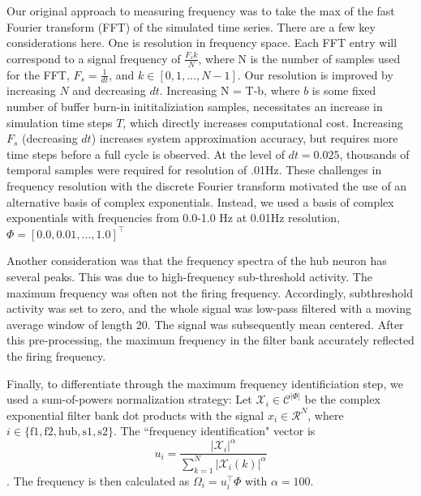 \documentclass[11pt]{article}
\begin{document}
Our original approach to measuring frequency was to take the max of the fast Fourier transform (FFT) of the simulated time series.  There are a few key considerations here.  One is resolution in frequency space.  Each FFT entry will correspond to a signal frequency of $\frac{F_s k}{N}$, where N is the number of samples used for the FFT, $F_s = \frac{1}{dt}$, and $k \in \left[0, 1, ..., N-1\right]$.  Our resolution is improved by increasing $N$ and decreasing $dt$.  Increasing N = T-b, where $b$ is some fixed number of buffer burn-in inititaliziation samples, necessitates an increase in simulation time steps $T$, which directly increases computational cost.  Increasing $F_s$ (decreasing $dt$) increases system approximation accuracy, but requires more time steps before a full cycle is observed.  At the level of $dt = 0.025$, thousands of temporal samples were required for resolution of .01Hz.  These challenges in frequency resolution with the discrete Fourier transform motivated the use of an alternative basis of complex exponentials.  Instead, we used a basis of complex exponentials with frequencies from 0.0-1.0 Hz at 0.01Hz resolution, $\Phi = \left[ 0.0, 0.01, ..., 1.0 \right]^\top$

Another consideration was that the frequency spectra of the hub neuron has several peaks.  This was due to high-frequency sub-threshold activity. The maximum frequency was often not the firing frequency.  Accordingly, subthreshold activity was set to zero, and the whole signal was low-pass filtered with a moving average window of length 20.  The signal was subsequently mean centered.  After this pre-processing, the maximum frequency in the filter bank accurately reflected the firing frequency.

Finally, to differentiate through the maximum frequency identificiation step, we used a sum-of-powers normalization strategy: Let $\mathcal{X}_i \in \mathcal{C}^{|\Phi|}$ be the complex exponential filter bank dot products with the signal $x_i \in \mathcal{R}^{N}$, where $i \in \{ \text{f1}, \text{f2}, \text{hub}, \text{s1}, \text{s2} \}$.  The ``frequency identification" vector is \[u_i = \frac{|\mathcal{X}_i|^\alpha}{\sum_{k=1}^N |\mathcal{X}_i(k)|^\alpha} \].  The frequency is then calculated as $\Omega_i = u_i^\top \Phi$ with $\alpha = 100$.
\end{document}
